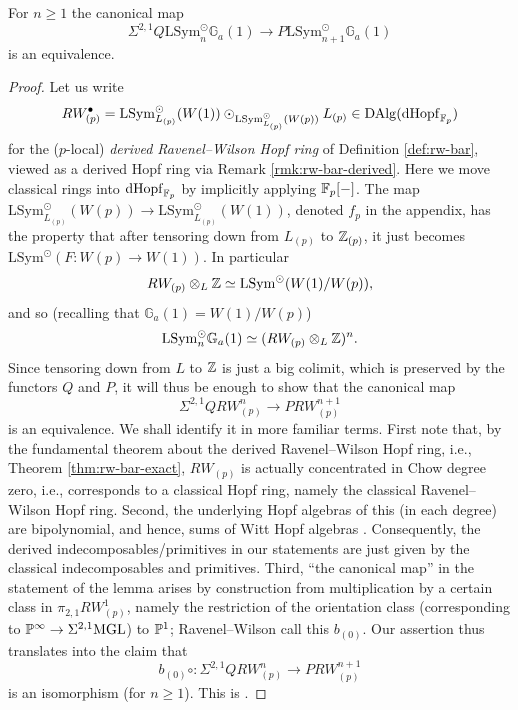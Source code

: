 \documentclass{amsart}
\renewcommand{\NB}[1]{}
\numberwithin{proposition}{section}
\numberwithin{equation}{section}
\def\LSym{\mathrm{LSym}}
\def\dHopf{\mathrm{dHopf}}
\def\DAlg{\mathrm{DAlg}}
\newcommand{\Ga}{{\mathbb{G}_a}}
\def\hotimes{\odot}
\begin{document}
\begin{lemma} \label{lemm:key2}
For $n \ge 1$ the canonical map \[ \Sigma^{2,1} Q\LSym_n^\hotimes \Ga(1) \to P\LSym_{n+1}^\hotimes \Ga(1) \] is an equivalence.
\end{lemma}
\begin{proof}
Let us write \[ RW_{(p)}^\bullet = \LSym^\hotimes_{L_{(p)}}(W(1)) \hotimes_{\LSym^\hotimes_{L_{(p)}}(W(p))} L_{(p)} \in \DAlg(\dHopf_{\F_p}) \] for the ($p$-local) \emph{derived Ravenel--Wilson Hopf ring} of Definition \ref{def:rw-bar}, viewed as a derived Hopf ring via Remark \ref{rmk:rw-bar-derived}. %
Here we move classical rings into $\dHopf_{\F_p}$ by implicitly applying $\F_p[\ph]$.
The map $\LSym^\hotimes_{L_{(p)}}(W(p)) \to \LSym^\hotimes_{L_{(p)}}(W(1))$, denoted $f_p$ in the appendix, has the property that after tensoring down from $L_{(p)}$ to $\Z_{(p)}$, it just becomes $\LSym^\hotimes(F: W(p) \to W(1))$.
In particular \[ RW_{(p)} \otimes_L \Z \wequi \LSym^\hotimes(W(1)/W(p)), \] and so (recalling that $\Ga(1) = W(1)/W(p)$) \[ \LSym_n^\hotimes \Ga(1) \wequi (RW_{(p)} \otimes_L \Z)^n. \]
Since tensoring down from $L$ to $\Z$ is just a big colimit\NB{explain?}, which is preserved by the functors $Q$ and $P$, it will thus be enough to show that the canonical map \[ \Sigma^{2,1}QRW_{(p)}^n \to PRW_{(p)}^{n+1} \] is an equivalence.
We shall identify it in more familiar terms.
First note that, by the fundamental theorem about the derived Ravenel--Wilson Hopf ring, i.e., Theorem \ref{thm:rw-bar-exact}, $RW_{(p)}$ is actually concentrated in Chow degree zero, i.e., corresponds to a classical Hopf ring, namely the classical Ravenel--Wilson Hopf ring.\NB{the following references are really about $BP$ instead of $MU_{(p)}$...}
Second, the underlying Hopf algebras of this (in each degree) are bipolynomial, and hence, sums of Witt Hopf algebras \cite[Proposition 3.6]{WSWThesis}.
Consequently, the derived indecomposables/primitives in our statements are just given by the classical indecomposables and primitives.
Third, ``the canonical map'' in the statement of the lemma arises by construction from multiplication by a certain class in $\pi_{2,1} RW_{(p)}^1$, namely the restriction of the orientation class (corresponding to $\P^\infty \to \Sigma^{2,1}\MGL$) to $\P^1$; Ravenel--Wilson call this $b_{(0)}$.\NB{justify last assertion?}
Our assertion thus translates into the claim that \[ b_{(0)} \circ: \Sigma^{2,1} QRW_{(p)}^n \to PRW_{(p)}^{n+1} \] is an isomorphism (for $n \ge 1$).
This is \cite[Theorem 5.3]{ravenel-wilson}.
\end{proof}
\end{document}
